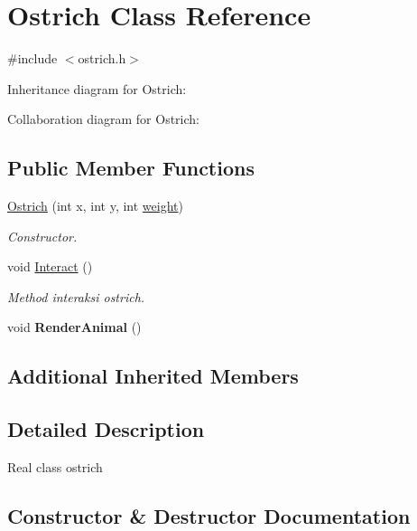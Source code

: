 \hypertarget{classOstrich}{}\section{Ostrich Class Reference}
\label{classOstrich}


{\ttfamily \#include $<$ostrich.\+h$>$}



Inheritance diagram for Ostrich\+:


Collaboration diagram for Ostrich\+:
\subsection*{Public Member Functions}
\begin{DoxyCompactItemize}
\item 
\hyperlink{classOstrich_ab7d9c0d88edc1f438e4ccfe1e604879e}{Ostrich} (int x, int y, int \hyperlink{classAnimal_a9a3b22f243f7109c57f36b3c660feb6e}{weight})
\begin{DoxyCompactList}\small\item\em Constructor. \end{DoxyCompactList}\item 
void \hyperlink{classOstrich_a2e5ca298073e5f2030a290e3501259f4}{Interact} ()\hypertarget{classOstrich_a2e5ca298073e5f2030a290e3501259f4}{}\label{classOstrich_a2e5ca298073e5f2030a290e3501259f4}

\begin{DoxyCompactList}\small\item\em Method interaksi ostrich. \end{DoxyCompactList}\item 
void {\bfseries Render\+Animal} ()\hypertarget{classOstrich_a880de2de243b3b248d7a4776f8b56fc3}{}\label{classOstrich_a880de2de243b3b248d7a4776f8b56fc3}

\end{DoxyCompactItemize}
\subsection*{Additional Inherited Members}


\subsection{Detailed Description}
Real class ostrich 

\subsection{Constructor \& Destructor Documentation}

